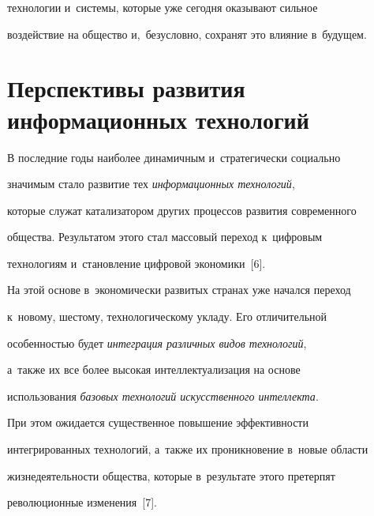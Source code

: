 технологии и~сис\-те\-мы, которые уже сегодня оказывают сильное 


воздействие на общество и,~безуслов\-но, сохранят это влияние в~будущем.





  \vspace*{-3pt}


  


   \section{Перспективы развития информационных технологий}


   


   \vspace*{-3pt}


   


   В последние годы наиболее динамичным и~стратегически социально 


значимым стало развитие тех \textit{информационных технологий}, 


которые служат катализатором других процессов развития современного 


общества. Результатом этого стал массовый переход к~циф\-ро\-вым 


технологиям и~становление циф\-ро\-вой экономики~[6].


   


   На этой основе в~экономически развитых странах уже начался переход 


к~новому, шестому, технологическому укладу. Его отличительной 


осо\-бен\-ностью будет \textit{интеграция различных видов технологий}, 


а~так\-же их все более высокая интеллектуализация на основе 


использования \textit{базовых технологий искусственного интеллекта}. 


При этом ожидается существенное повышение эф\-фек\-тив\-ности 


интегрированных технологий, а~так\-же их проникновение в~новые области 


жиз\-не\-де\-я\-тель\-ности общества, которые в~результате этого претерпят 


революционные изменения~[7]. 


